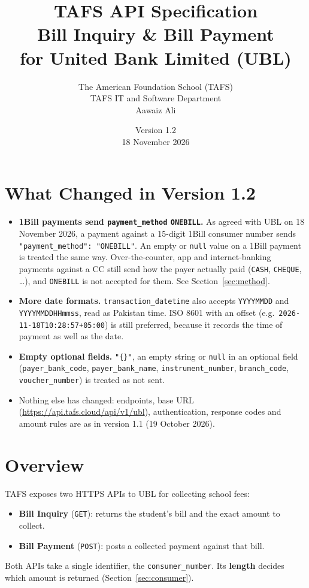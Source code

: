 \documentclass[11pt]{article}
\title{\textbf{TAFS API Specification} \\[4pt]
\large Bill Inquiry \& Bill Payment \\ for United Bank Limited (UBL)}
\author{The American Foundation School (TAFS) \\ TAFS IT and Software Department \\[4pt] Aawaiz Ali}
\date{Version 1.2 \\ 18 November 2026}
\begin{document}
\begin{titlepage}
\vspace*{\fill}
{\let\newpage\relax\maketitle}
\thispagestyle{empty}
\vspace*{\fill}
\end{titlepage}

\section*{What Changed in Version 1.2}
\begin{itemize}
  \item \textbf{1Bill payments send \texttt{payment\_method} \texttt{ONEBILL}.} As agreed with UBL on 18 November 2026,
        a payment against a 15-digit 1Bill consumer number sends \texttt{"payment\_method": "ONEBILL"}. An empty or
        \texttt{null} value on a 1Bill payment is treated the same way. Over-the-counter, app and internet-banking payments
        against a CC still send how the payer actually paid (\texttt{CASH}, \texttt{CHEQUE}, \ldots), and
        \texttt{ONEBILL} is not accepted for them. See Section~\ref{sec:method}.
  \item \textbf{More date formats.} \texttt{transaction\_datetime} also accepts \texttt{YYYYMMDD} and
        \texttt{YYYYMMDDHHmmss}, read as Pakistan time. ISO 8601 with an offset (e.g.\ \texttt{2026-11-18T10:28:57+05:00})
        is still preferred, because it records the time of payment as well as the date.
  \item \textbf{Empty optional fields.} \texttt{"\{\}"}, an empty string or \texttt{null} in an optional field
        (\texttt{payer\_bank\_code}, \texttt{payer\_bank\_name}, \texttt{instrument\_number}, \texttt{branch\_code},
        \texttt{voucher\_number}) is treated as not sent.
  \item Nothing else has changed: endpoints, base URL (\url{https://api.tafs.cloud/api/v1/ubl}), authentication,
        response codes and amount rules are as in version 1.1 (19 October 2026).
\end{itemize}

\tableofcontents
\newpage

\section{Overview}
TAFS exposes two HTTPS APIs to UBL for collecting school fees:
\begin{itemize}[nosep]
  \item \textbf{Bill Inquiry} (\texttt{GET}): returns the student's bill and the exact amount to collect.
  \item \textbf{Bill Payment} (\texttt{POST}): posts a collected payment against that bill.
\end{itemize}
Both APIs take a single identifier, the \texttt{consumer\_number}. Its \textbf{length} decides which amount
is returned (Section~\ref{sec:consumer}).
\end{document}
